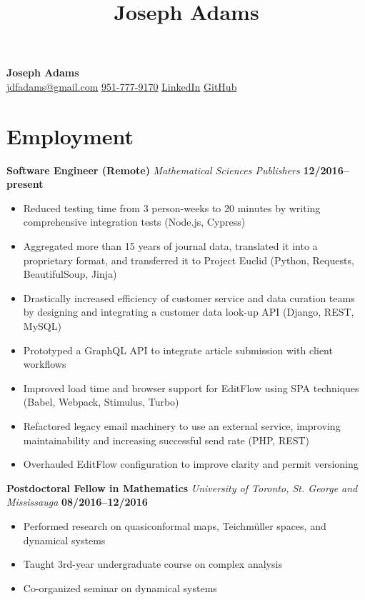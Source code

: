 \documentclass[11pt]{article}
\title{Joseph Adams}
\makeatletter
\newcommand\email{jdfadams@gmail.com}
\newcommand\phone{951-777-9170}
\makeatother
\begin{document}

\begin{center}
  \textbf{\Large Joseph Adams} \\[1.5\baselineskip]
  \href{mailto:\email}{\email} \quad
  \href{tel:1-\phone}{\phone} \quad
  \href{http://linkedin.com/in/jdfadams}{LinkedIn} \quad
  \href{http://github.com/jdfadams}{GitHub}
\end{center}

\section*{Employment}
\noindent\textbf{Software Engineer (Remote)} \emph{Mathematical Sciences Publishers} \hfill \textbf{12/2016--present}
\begin{itemize}
  \item Reduced testing time from 3 person-weeks to 20 minutes by writing comprehensive integration tests (Node.js, Cypress)
  \item Aggregated more than 15 years of journal data, translated it into a proprietary format, and transferred it to Project Euclid (Python, Requests, BeautifulSoup, Jinja)
  \item Drastically increased efficiency of customer service and data curation teams by designing and integrating a customer data look-up API (Django, REST, MySQL) 
  \item Prototyped a GraphQL API to integrate article submission with client workflows
  \item Improved load time and browser support for EditFlow using SPA techniques (Babel, Webpack, Stimulus, Turbo)
  \item Refactored legacy email machinery to use an external service, improving maintainability and increasing successful send rate (PHP, REST)
  \item Overhauled EditFlow configuration to improve clarity and permit versioning
\end{itemize}
\vspace{0.5cm}
\noindent\textbf{Postdoctoral Fellow in Mathematics} \emph{University of Toronto, St. George and Mississauga} \hfill \textbf{08/2016--12/2016}
\begin{itemize}
  \itemsep 0em
  \item Performed research on quasiconformal maps, Teichm\"{u}ller spaces, and dynamical systems
  \item Taught 3rd-year undergraduate course on complex analysis
  \item Co-organized seminar on dynamical systems
\end{itemize}
\end{document}
